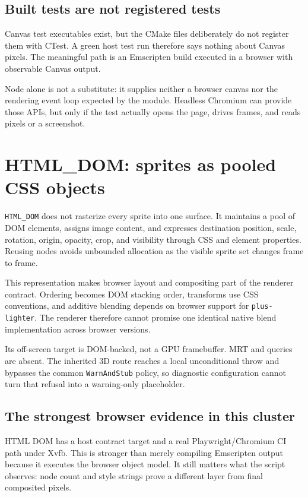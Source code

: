 \subsection{Built tests are not registered tests}

Canvas test executables exist, but the CMake files deliberately do not register them with
CTest.  A green host test run therefore says nothing about Canvas pixels.  The meaningful path
is an Emscripten build executed in a browser with observable Canvas output.

Node alone is not a substitute: it supplies neither a browser canvas nor the rendering event
loop expected by the module.  Headless Chromium can provide those APIs, but only if the test
actually opens the page, drives frames, and reads pixels or a screenshot.

\section{HTML\_DOM: sprites as pooled CSS objects}

\texttt{HTML\_DOM} does not rasterize every sprite into one surface.  It maintains a pool of
DOM elements, assigns image content, and expresses destination position, scale, rotation,
origin, opacity, crop, and visibility through CSS and element properties.  Reusing nodes avoids
unbounded allocation as the visible sprite set changes frame to frame.

This representation makes browser layout and compositing part of the renderer contract.
Ordering becomes DOM stacking order, transforms use CSS conventions, and additive blending
depends on browser support for \texttt{plus-lighter}.  The renderer therefore cannot promise
one identical native blend implementation across browser versions.

Its off-screen target is DOM-backed, not a GPU framebuffer.  MRT and queries are absent.  The
inherited 3D route reaches a local unconditional throw and bypasses the common
\texttt{WarnAndStub} policy, so diagnostic configuration cannot turn that refusal into a
warning-only placeholder.

\subsection{The strongest browser evidence in this cluster}

HTML DOM has a host contract target and a real Playwright/Chromium CI path under Xvfb.  This is
stronger than merely compiling Emscripten output because it executes the browser object model.
It still matters what the script observes: node count and style strings prove a different layer
from final composited pixels.


